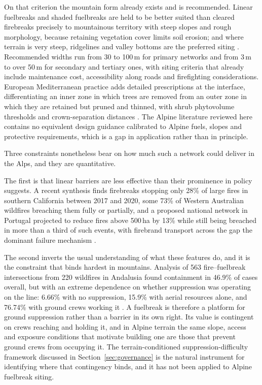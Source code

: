 \documentclass[11pt,a4paper]{article}
\begin{document}
On that criterion the mountain form already exists and is recommended. Linear fuelbreaks and shaded fuelbreaks are held to be better suited than cleared firebreaks precisely to mountainous territory with steep slopes and rough morphology, because retaining vegetation cover limits soil erosion; and where terrain is very steep, ridgelines and valley bottoms are the preferred siting \citep{ascoli_firebreak_2018}. Recommended widths run from 30 to 100\,m for primary networks and from 3\,m to over 50\,m for secondary and tertiary ones, with siting criteria that already include maintenance cost, accessibility along roads and firefighting considerations. European Mediterranean practice adds detailed prescriptions at the interface, differentiating an inner zone in which trees are removed from an outer zone in which they are retained but pruned and thinned, with shrub phytovolume thresholds and crown-separation distances \citep{rigolot_recommendations_2003}. The Alpine literature reviewed here contains no equivalent design guidance calibrated to Alpine fuels, slopes and protective requirements, which is a gap in application rather than in principle.

Three constraints nonetheless bear on how much such a network could deliver in the Alps, and they are quantitative.

The first is that linear barriers are less effective than their prominence in policy suggests. A recent synthesis finds firebreaks stopping only 28\% of large fires in southern California between 2017 and 2020, some 73\% of Western Australian wildfires breaching them fully or partially, and a proposed national network in Portugal projected to reduce fires above 500\,ha by 13\% while still being breached in more than a third of such events, with firebrand transport across the gap the dominant failure mechanism \citep{zong_effectiveness_2026}.

The second inverts the usual understanding of what these features do, and it is the constraint that binds hardest in mountains. Analysis of 563 fire--fuelbreak intersections from 220 wildfires in Andalusia found containment in 46.9\% of cases overall, but with an extreme dependence on whether suppression was operating on the line: 6.66\% with no suppression, 15.9\% with aerial resources alone, and 76.74\% with ground crews working it \citep{ortega_modeling_2024}. A fuelbreak is therefore a platform for ground suppression rather than a barrier in its own right. Its value is contingent on crews reaching and holding it, and in Alpine terrain the same slope, access and exposure conditions that motivate building one are those that prevent ground crews from occupying it. The terrain-conditioned suppression-difficulty framework discussed in Section~\ref{sec:governance} is the natural instrument for identifying where that contingency binds, and it has not been applied to Alpine fuelbreak siting.
\end{document}

